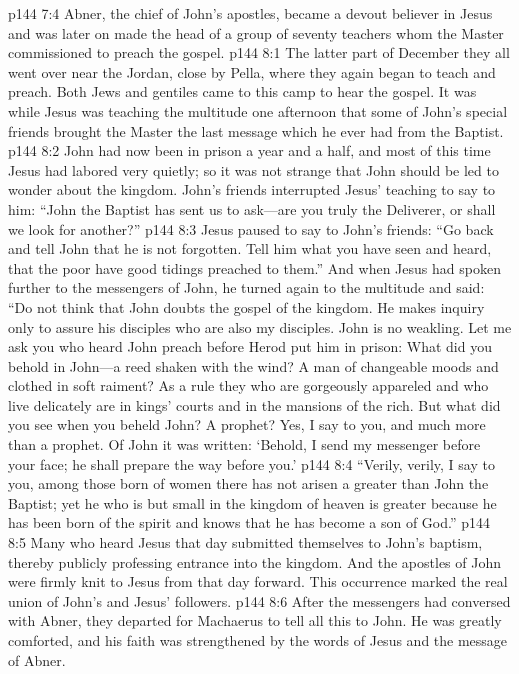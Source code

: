 \vs p144 7:4 Abner, the chief of John’s apostles, became a devout believer in Jesus and was later on made the head of a group of seventy teachers whom the Master commissioned to preach the gospel.
\vs p144 8:1 The latter part of December they all went over near the Jordan, close by Pella, where they again began to teach and preach. Both Jews and gentiles came to this camp to hear the gospel. It was while Jesus was teaching the multitude one afternoon that some of John’s special friends brought the Master the last message which he ever had from the Baptist.
\vs p144 8:2 John had now been in prison a year and a half, and most of this time Jesus had labored very quietly; so it was not strange that John should be led to wonder about the kingdom. John’s friends interrupted Jesus’ teaching to say to him: “John the Baptist has sent us to ask---are you truly the Deliverer, or shall we look for another?”
\vs p144 8:3 Jesus paused to say to John’s friends: \textcolor{ubdarkred}{“Go back and tell John that he is not forgotten. Tell him what you have seen and heard, that the poor have good tidings preached to them.”} And when Jesus had spoken further to the messengers of John, he turned again to the multitude and said: \textcolor{ubdarkred}{“Do not think that John doubts the gospel of the kingdom. He makes inquiry only to assure his disciples who are also my disciples. John is no weakling. Let me ask you who heard John preach before Herod put him in prison: What did you behold in John---a reed shaken with the wind? A man of changeable moods and clothed in soft raiment? As a rule they who are gorgeously appareled and who live delicately are in kings’ courts and in the mansions of the rich. But what did you see when you beheld John? A prophet? Yes, I say to you, and much more than a prophet. Of John it was written: ‘Behold, I send my messenger before your face; he shall prepare the way before you.’}
\vs p144 8:4 \textcolor{ubdarkred}{“Verily, verily, I say to you, among those born of women there has not arisen a greater than John the Baptist; yet he who is but small in the kingdom of heaven is greater because he has been born of the spirit and knows that he has become a son of God.”}
\vs p144 8:5 Many who heard Jesus that day submitted themselves to John’s baptism, thereby publicly professing entrance into the kingdom. And the apostles of John were firmly knit to Jesus from that day forward. This occurrence marked the real union of John’s and Jesus’ followers.
\vs p144 8:6 After the messengers had conversed with Abner, they departed for Machaerus to tell all this to John. He was greatly comforted, and his faith was strengthened by the words of Jesus and the message of Abner.
